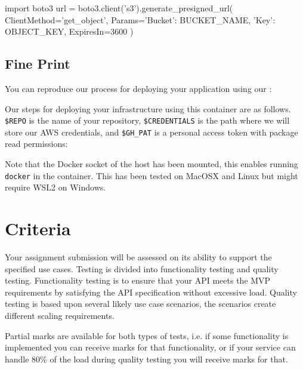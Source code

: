 \documentclass{csse4400}
\begin{document}
\begin{code}[language=python]{}
import boto3
url = boto3.client('s3').generate_presigned_url(
  ClientMethod='get_object', 
  Params={'Bucket': BUCKET_NAME, 'Key': OBJECT_KEY},
  ExpiresIn=3600
)
\end{code}


\subsection{Fine Print}
You can reproduce our process for deploying your application using our :

\noindent
Our steps for deploying your infrastructure using this container are as follows.
\texttt{\$REPO} is the name of your repository,
\texttt{\$CREDENTIALS} is the path where we will store our AWS credentials,
and \texttt{\$GH\_PAT} is a personal access token with package read permissions:

\noindent
Note that the Docker socket of the host has been mounted,
this enables running \texttt{docker} in the container.
This has been tested on MacOSX and Linux but might require WSL2 on Windows.

\section{Criteria}
Your assignment submission will be assessed on its ability to support the specified use cases.
Testing is divided into functionality testing and quality testing.
Functionality testing is to ensure that your API meets the MVP requirements by satisfying the API specification without excessive load.
Quality testing is based upon several likely use case scenarios,
the scenarios create different scaling requirements.

Partial marks are available for both types of tests,
i.e. if some functionality is implemented you can receive marks for that functionality,
or if your service can handle 80\% of the load during quality testing you will receive marks for that.
\end{document}
